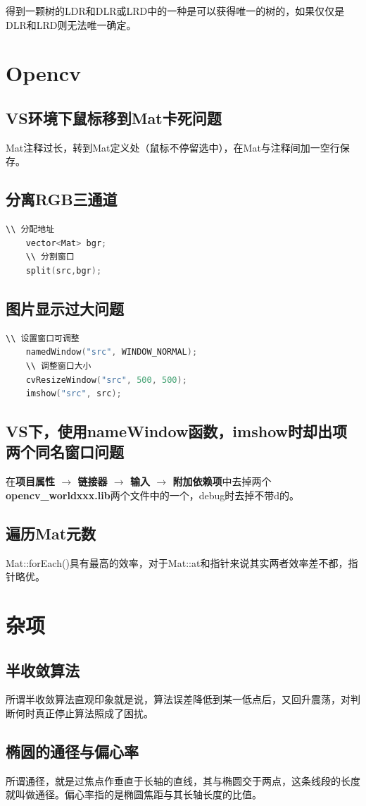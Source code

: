 \documentclass[12pt,twoside]{report}
\begin{document}
得到一颗树的LDR和DLR或LRD中的一种是可以获得唯一的树的，如果仅仅是DLR和LRD则无法唯一确定。

\chapter{Opencv}
\section{VS环境下鼠标移到Mat卡死问题}
Mat注释过长，转到Mat定义处（鼠标不停留选中），在Mat与注释间加一空行保存。

\section{分离RGB三通道}

\begin{lstlisting}[language=C]
    \\ 分配地址
    vector<Mat> bgr;
    \\ 分割窗口
    split(src,bgr); 
\end{lstlisting}

\section{图片显示过大问题}

\begin{lstlisting}[language=C]
    \\ 设置窗口可调整
    namedWindow("src", WINDOW_NORMAL); 
    \\ 调整窗口大小
    cvResizeWindow("src", 500, 500);
    imshow("src", src);   
\end{lstlisting}

\section{VS下，使用nameWindow函数，imshow时却出项两个同名窗口问题}

在\textbf{项目属性 $\rightarrow$ 链接器 $\rightarrow$ 输入 $\rightarrow$ 附加依赖项}中去掉两个\textbf{opencv\_worldxxx.lib}两个文件中的一个，debug时去掉不带d的。

\section{遍历Mat元数}
Mat::forEach()具有最高的效率，对于Mat::at和指针来说其实两者效率差不都，指针略优。

\chapter{杂项}

\section{半收敛算法}
所谓半收敛算法直观印象就是说，算法误差降低到某一低点后，又回升震荡，对判断何时真正停止算法照成了困扰。

\section{椭圆的通径与偏心率}
所谓通径，就是过焦点作垂直于长轴的直线，其与椭圆交于两点，这条线段的长度就叫做通径。偏心率指的是椭圆焦距与其长轴长度的比值。
\end{document}
